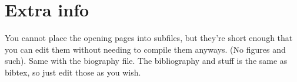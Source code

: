 \documentclass[../main.tex]{subfiles}
\begin{document}
\chapter{Extra info}
You cannot place the opening pages into subfiles, but they're short enough that you can edit them without needing to compile them anyways. (No figures and such). Same with the biography file. The bibliography and stuff is the same as bibtex, so just edit those as you wish.
\end{document}
